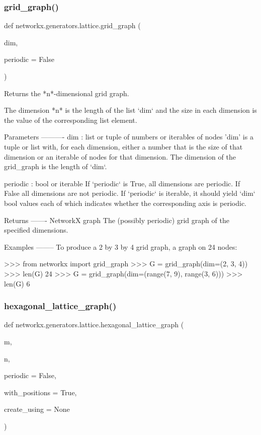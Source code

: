 \subsubsection{\texorpdfstring{grid\+\_\+graph()}{grid\_graph()}}
{\footnotesize\ttfamily def networkx.\+generators.\+lattice.\+grid\+\_\+graph (\begin{DoxyParamCaption}\item[{}]{dim,  }\item[{}]{periodic = {\ttfamily False} }\end{DoxyParamCaption})}

\begin{DoxyVerb}Returns the *n*-dimensional grid graph.

The dimension *n* is the length of the list `dim` and the size in
each dimension is the value of the corresponding list element.

Parameters
----------
dim : list or tuple of numbers or iterables of nodes
    'dim' is a tuple or list with, for each dimension, either a number
    that is the size of that dimension or an iterable of nodes for
    that dimension. The dimension of the grid_graph is the length
    of `dim`.

periodic : bool or iterable
    If `periodic` is True, all dimensions are periodic. If False all
    dimensions are not periodic. If `periodic` is iterable, it should
    yield `dim` bool values each of which indicates whether the
    corresponding axis is periodic.

Returns
-------
NetworkX graph
    The (possibly periodic) grid graph of the specified dimensions.

Examples
--------
To produce a 2 by 3 by 4 grid graph, a graph on 24 nodes:

>>> from networkx import grid_graph
>>> G = grid_graph(dim=(2, 3, 4))
>>> len(G)
24
>>> G = grid_graph(dim=(range(7, 9), range(3, 6)))
>>> len(G)
6
\end{DoxyVerb}
 \mbox{\label{namespacenetworkx_1_1generators_1_1lattice_aa7e6e82829e0ed987ca3d9651ba549d2}} 
\subsubsection{\texorpdfstring{hexagonal\+\_\+lattice\+\_\+graph()}{hexagonal\_lattice\_graph()}}
{\footnotesize\ttfamily def networkx.\+generators.\+lattice.\+hexagonal\+\_\+lattice\+\_\+graph (\begin{DoxyParamCaption}\item[{}]{m,  }\item[{}]{n,  }\item[{}]{periodic = {\ttfamily False},  }\item[{}]{with\+\_\+positions = {\ttfamily True},  }\item[{}]{create\+\_\+using = {\ttfamily None} }\end{DoxyParamCaption})}

